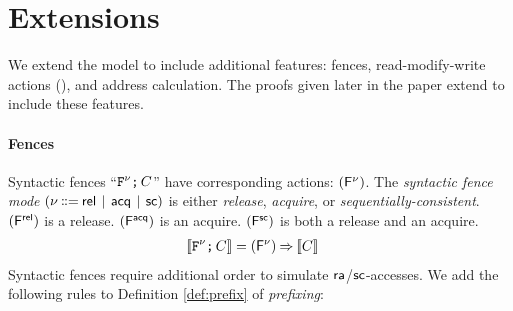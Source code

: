 \section{Extensions}
\label{sec:variants}

We extend the model to include additional features: fences, read-modify-write
actions (\RMWs), and address calculation. The proofs given later in the paper
extend to include these features.

\paragraph{Fences}

Syntactic fences
``$\texttt{F}^{\nu} \texttt{;}\,\allowbreak C$'' have corresponding  actions: $(\smash{\mathsf{F}^{\nu}})$.  The \emph{syntactic fence mode}
$(\fmode \!\!\BNFDEF\!\! \modeREL \!\BNFSEP\! \modeACQ \!\BNFSEP\! \modeSC)$
is either \emph{release}, \emph{acquire}, or \emph{sequentially-consistent}.
$(\smash{\mathsf{F}^{{\mathsf{rel}}}})$ is a release. $(\smash{\mathsf{F}^{{\mathsf{acq}}}})$ is an acquire.
$(\smash{\mathsf{F}^{{\mathsf{sc}}}})$ is both a release and an acquire.
\begin{align*}
  \llbracket\texttt{F}^{\nu}\texttt{;}\,\allowbreak C\rrbracket & =
  (\smash{\mathsf{F}^{\nu}}) \mathbin\Rightarrow \llbracket C\rrbracket
\end{align*}
Syntactic fences require additional order to simulate ${\mathsf{ra}}$/${\mathsf{sc}}$-accesses.
We add the following rules 
to Definition \ref{def:prefix} of \emph{prefixing}:

